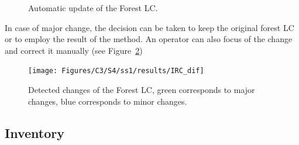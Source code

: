 \begin{figure}[htbp]
\begin{center}
\begingroup
\captionsetup[subfigure]{width=0.5\textwidth}
\hfill
{}
\endgroup
\caption{Automatic update of the Forest LC.}
\label{fig:new_BD}
\end{center}
\end{figure}

In case of major change, the decision can be taken to keep the original forest LC or to employ the result of the method. An operator can also focus of the change and correct it manually (see Figure~\ref{fig:IRC_change})

\begin{figure}[htbp]
\begin{center}
\texttt{[image: Figures/C3/S4/ss1/results/IRC\_dif]}
\caption{Detected changes of the Forest LC, green corresponds to major changes, blue corresponds to minor changes.}
\label{fig:IRC_change}
\end{center}
\end{figure}

\subsection{Inventory}




\stopcontents[chapters]
